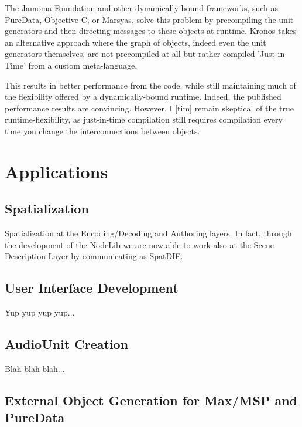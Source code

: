 \documentclass[twoside,10pt]{article}
\begin{document}
The Jamoma Foundation and other dynamically-bound frameworks, such as PureData, Objective-C, or Marsyas, solve this problem by precompiling the unit generators and then directing messages to these objects at runtime.  Kronos takes an alternative approach where the graph of objects, indeed even the unit generators themselves, are not precompiled at all but rather compiled 'Just in Time' from a custom meta-language. 

This results in better performance from the code, while still maintaining much of the flexibility offered by a dynamically-bound runtime.  Indeed, the published performance results are convincing.  However, I [tim] remain skeptical of the true runtime-flexibility, as just-in-time compilation still requires compilation every time you change the interconnections between objects.




\section{Applications} %

\subsection{Spatialization}

Spatialization at the Encoding/Decoding and Authoring layers\cite{Peters:2009}.  In fact, through the development of the NodeLib we are now able to work also at the Scene Description Layer by communicating as SpatDIF\cite{Peters:2008spatdif}.

\subsection{User Interface Development}

Yup yup yup yup...

\subsection{AudioUnit Creation}

Blah blah blah...

\subsection{External Object Generation for Max/MSP and PureData}
\end{document}

